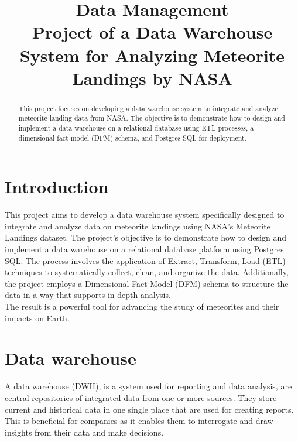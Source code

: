 \documentclass[conference]{IEEEtran}
\begin{document}
	
	\title{Data Management \\ Project of a Data Warehouse System for Analyzing Meteorite Landings by NASA}
	
	\author{
	}
	\maketitle
	
	\begin{abstract}
			This project focuses on developing a data warehouse system to integrate and analyze meteorite landing data from NASA. The objective is to demonstrate how to design and implement a data warehouse on a relational database using ETL processes, a dimensional fact model (DFM) schema, and Postgres SQL for deployment. 
	\end{abstract}
	
	\section{Introduction}
	
	This project aims to develop a data warehouse system specifically designed to integrate and analyze data on meteorite landings using NASA's Meteorite Landings dataset. The project’s objective is to demonstrate how to design and implement a data warehouse on a relational database platform using Postgres SQL. The process involves the application of Extract, Transform, Load (ETL) techniques to systematically collect, clean, and organize the data. Additionally, the project employs a Dimensional Fact Model (DFM) schema to structure the data in a way that supports in-depth analysis. \\ The result is a powerful tool for advancing the study of meteorites and their impacts on Earth.
	
	\section{Data warehouse}
	A data warehouse (DWH), is a system used for reporting and data analysis, are central repositories of integrated data from one or more sources. They store current and historical data in one single place that are used for creating reports. This is beneficial for companies as it enables them to interrogate and draw insights from their data and make decisions.
\end{document}
